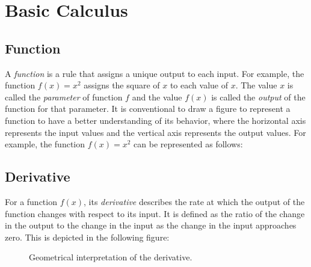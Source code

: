 \documentclass[../main.tex]{subfiles}
\begin{document}
\section{Basic Calculus}

\subsection{Function}

A \emph{function} is a rule that assigns a unique output to each input. For example, the function \(f(x) = x^2\) assigns the square of \(x\) to each value of \(x\). The value $x$ is called the \emph{parameter} of function $f$ and the value $f(x)$ is called the \emph{output} of the function for that parameter. It is conventional to draw a figure to represent a function to have a better understanding of its behavior, where the horizontal axis represents the input values and the vertical axis represents the output values. For example, the function \(f(x) = x^2\) can be represented as follows:

\begin{figure}[h]
\centering
{}
\end{figure}

\subsection{Derivative}

For a function \(f(x)\), its \emph{derivative} describes the rate at which the output of the function changes with respect to its input. It is defined as the ratio of the change in the output to the change in the input as the change in the input approaches zero. This is depicted in the following figure:

\begin{figure}[h]
    \centering
    \caption{Geometrical interpretation of the derivative.}
    \label{fig:derivative}
\end{figure}
\end{document}
